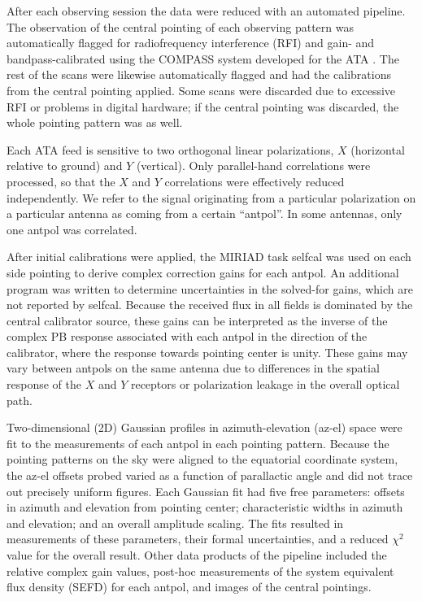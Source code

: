 \documentclass[preprint]{aastex}
\begin{document}
After each observing session the data were reduced with an automated
pipeline. The observation of the central pointing of each observing
pattern was automatically flagged for radiofrequency interference
(RFI) and gain- and bandpass-calibrated using the COMPASS system
developed for the ATA \citep{Keating2010}. The rest of the scans were
likewise automatically flagged and had the calibrations from the
central pointing applied. Some scans were discarded due to excessive
RFI or problems in digital hardware; if the central pointing was
discarded, the whole pointing pattern was as well.

Each ATA feed is sensitive to two orthogonal linear polarizations, $X$
(horizontal relative to ground) and $Y$ (vertical). Only parallel-hand
correlations were processed, so that the $X$ and $Y$ correlations were
effectively reduced independently. We refer to the signal originating
from a particular polarization on a particular antenna as coming from
a certain ``antpol''. In some antennas, only one antpol was
correlated.

After initial calibrations were applied, the MIRIAD \citep{Sault1995}
task \textsf{selfcal} was used on each side pointing to derive complex
correction gains for each antpol. An additional program was written to
determine uncertainties in the solved-for gains, which are not
reported by \textsf{selfcal}. Because the received flux in all fields
is dominated by the central calibrator source, these gains can be
interpreted as the inverse of the complex PB response associated with
each antpol in the direction of the calibrator, where the response
towards pointing center is unity. These gains may vary between antpols
on the same antenna due to differences in the spatial response of the
$X$ and $Y$ receptors or polarization leakage in the overall optical
path.

Two-dimensional (2D) Gaussian profiles in azimuth-elevation (az-el)
space were fit to the measurements of each antpol in each pointing
pattern. Because the pointing patterns on the sky were aligned to the
equatorial coordinate system, the az-el offsets probed varied as a
function of parallactic angle and did not trace out precisely uniform
figures. Each Gaussian fit had five free parameters: offsets in
azimuth and elevation from pointing center; characteristic widths in
azimuth and elevation; and an overall amplitude scaling. The fits
resulted in measurements of these parameters, their formal
uncertainties, and a reduced $\chi^2$ value for the overall
result. Other data products of the pipeline included the relative
complex gain values, post-hoc measurements of the system equivalent
flux density (SEFD) for each antpol, and images of the central
pointings.
\end{document}
